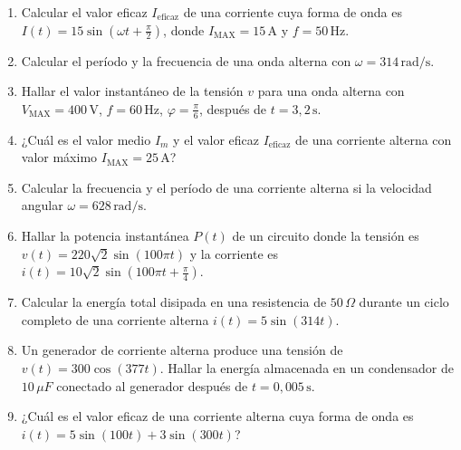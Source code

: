 \documentclass[../main]{subfiles}
\begin{document}
\begin{enumerate}
    \item Calcular el valor eficaz $I_{\text{eficaz}}$ de una corriente cuya forma de onda es $I(t) = 15 \sin(\omega t + \frac{\pi}{2})$, donde $I_{\text{MAX}} = 15\,\text{A}$ y $f = 50\,\text{Hz}$.
    
    \item Calcular el período y la frecuencia de una onda alterna con $\omega = 314\,\text{rad/s}$.
    
    \item Hallar el valor instantáneo de la tensión $v$ para una onda alterna con $V_{\text{MAX}} = 400\,\text{V}$, $f = 60\,\text{Hz}$, $\varphi = \frac{\pi}{6}$, después de $t = 3,2\,\text{s}$.
    
    \item ¿Cuál es el valor medio $I_m$ y el valor eficaz $I_{\text{eficaz}}$ de una corriente alterna con valor máximo $I_{\text{MAX}} = 25\,\text{A}$?


    
    \item Calcular la frecuencia y el período de una corriente alterna si la velocidad angular $\omega = 628\,\text{rad/s}$.

    \item Hallar la potencia instantánea $P(t)$ de un circuito donde la tensión es $v(t) = 220\sqrt{2} \sin(100\pi t)$ y la corriente es $i(t) = 10\sqrt{2} \sin(100\pi t + \frac{\pi}{4})$.
    
    \item Calcular la energía total disipada en una resistencia de $50\,\Omega$ durante un ciclo completo de una corriente alterna $i(t) = 5\sin(314t)$.
    
    \item Un generador de corriente alterna produce una tensión de $v(t) = 300\cos(377t)$. Hallar la energía almacenada en un condensador de $10\,\mu F$ conectado al generador después de $t=0,005\,\text{s}$.
    
    \item ¿Cuál es el valor eficaz de una corriente alterna cuya forma de onda es $i(t) = 5\sin(100t) + 3\sin(300t)$? 

   
\end{enumerate}
\end{document}
